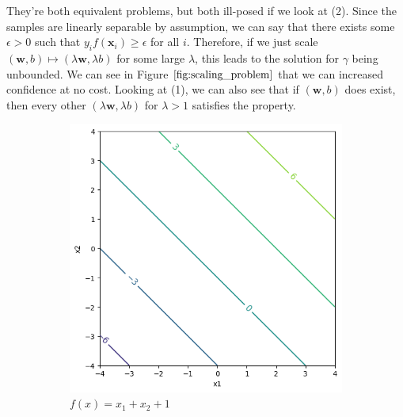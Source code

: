 \documentclass{article}
\theoremstyle{definition}
\theoremstyle{remark}
\theoremstyle{definition}
\begin{document}
They're both equivalent problems, but both ill-posed if we look at (2). Since the samples are linearly separable by assumption, we can say that there exists some $\epsilon > 0$ such that $y_i f(\mathbf{x}_i) \geq \epsilon$ for all $i$. Therefore, if we just scale $(\mathbf{w}, b) \mapsto (\lambda \mathbf{w}, \lambda b)$ for some large $\lambda$, this leads to the solution for $\gamma$ being unbounded. We can see in Figure $\ref{fig:scaling_problem}$ that we can increased confidence at no cost. Looking at (1), we can also see that if $(\mathbf{w}, b)$ does exist, then every other $(\lambda \mathbf{w}, \lambda b)$ for $\lambda > 1$ satisfies the property.   

\begin{figure}[hbt!] 
    \centering 
    \begin{subfigure}[b]{0.32\textwidth} 
        \centering 
        \includegraphics[width=\textwidth]{scaling1.png} 
        \caption{$f(x) = x_1 + x_2 + 1$} 
        \label{fig:original_scaled}
    \end{subfigure} 
    \hfill    
    \begin{subfigure}[b]{0.32\textwidth} 
        \centering 

\end{subfigure}
\end{figure}
\end{document}
